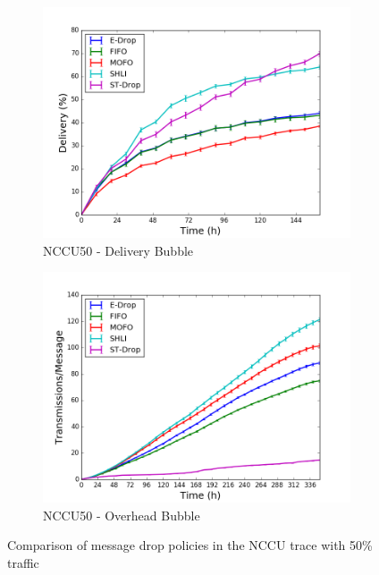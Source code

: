 \begin{figure}
    \begin{subfigure}[b]{0.5\columnwidth}
        \includegraphics[width=\linewidth]{imgs/nccu/50/BubbleRap-delivery.png}
        \caption{NCCU50 - Delivery Bubble}
        \label{fig:nccu50BubbleDel}
    \end{subfigure}
    \begin{subfigure}[b]{0.5\columnwidth}
        \includegraphics[width=\linewidth]{imgs/nccu/50/BubbleRap-overhead.png}
        \caption{NCCU50 - Overhead Bubble}
        \label{fig:nccu50BubbleOver}
    \end{subfigure}

    \caption{Comparison of message drop policies in the NCCU trace with 50\% traffic}
    \label{fig:nccu50}
\end{figure}

